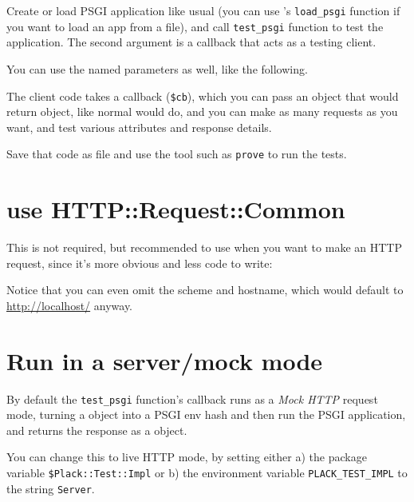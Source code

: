 
Create or load PSGI application like usual (you can use
\href{http://search.cpan.org/perldoc?Plack::Util}{}'s
\lstinline!load_psgi! function if you want to load an app from a
 file), and call \lstinline!test_psgi! function to test
the application. The second argument is a callback that acts as a
testing client.

You can use the named parameters as well, like the following.


The client code takes a callback (\lstinline!$cb!), which you can pass
an  object that would return  object, like
normal  would do, and you can make as many requests as you
want, and test various attributes and response details.

Save that code as  file and use the tool such as
\lstinline!prove! to run the tests.

\section{use HTTP::Request::Common}\label{use-httprequestcommon}

This is not required, but recommended to use
\href{http://search.cpan.org/perldoc?HTTP::Request::Common}{}
when you want to make an HTTP request, since it's more obvious and less
code to write:


Notice that you can even omit the scheme and hostname, which would
default to \url{http://localhost/} anyway.

\section{Run in a server/mock mode}\label{run-in-a-servermock-mode}

By default the \lstinline!test_psgi! function's callback runs as a
\emph{Mock HTTP} request mode, turning a  object into a
PSGI env hash and then run the PSGI application, and returns the
response as a  object.

You can change this to live HTTP mode, by setting either a) the package
variable \lstinline!$Plack::Test::Impl! or b) the environment variable
\lstinline!PLACK_TEST_IMPL! to the string \lstinline!Server!.

